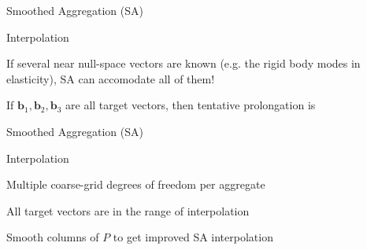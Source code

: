 \documentclass[18pt,xcolor=table]{beamer}
\begin{document}
\begin{frame}{Smoothed Aggregation (SA)}
\begin{block}{Interpolation}
\bit
\item If several near null-space vectors are known (e.g. the rigid body modes in elasticity), SA can accomodate all of them!
\item If $\mathbf{b}_1,\mathbf{b}_2,\mathbf{b}_3$ are all target vectors, then tentative prolongation is
\eit
\end{block}
\end{frame}

\begin{frame}{Smoothed Aggregation (SA)}
\begin{block}{Interpolation}
\bit
\item Multiple coarse-grid degrees of freedom per aggregate
\item All target vectors are in the range of interpolation
\item Smooth columns of $P$ to get improved SA interpolation
\eit
\end{block}
\end{frame}

\end{document}
